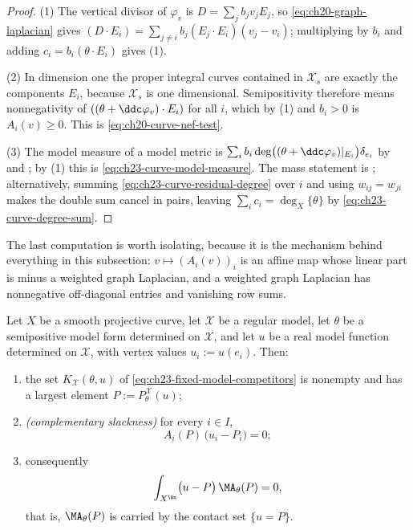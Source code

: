 \begin{proof}
(1) The vertical divisor of \(\varphi_v\) is \(D=\sum_jb_jv_jE_j\), so
\eqref{eq:ch20-graph-laplacian} gives
\((D\cdot E_i)=\sum_{j\ne i}b_j(E_j\cdot E_i)(v_j-v_i)\); multiplying by
\(b_i\) and adding \(c_i=b_i(\theta\cdot E_i)\) gives (1).

(2) In dimension one the proper integral curves contained in
\(\mathcal X_s\) are exactly the components \(E_i\), because
\(\mathcal X_s\) is one dimensional.  Semipositivity therefore means
nonnegativity of \(((\theta+\ddc\varphi_v)\cdot E_i)\) for all \(i\), which
by (1) and \(b_i>0\) is \(A_i(v)\geq0\).  This is
\eqref{eq:ch20-curve-nef-test}.

(3) The model measure of a model metric is
\(\sum_ib_i\deg\bigl((\theta+\ddc\varphi_v)|_{E_i}\bigr)\delta_{e_i}\) by
 and ; by (1) this is
\eqref{eq:ch23-curve-model-measure}.  The mass statement is
; alternatively, summing
\eqref{eq:ch23-curve-residual-degree} over \(i\) and using
\(w_{ij}=w_{ji}\) makes the double sum cancel in pairs, leaving
\(\sum_ic_i=\deg_X\{\theta\}\) by \eqref{eq:ch23-curve-degree-sum}.
\end{proof}

The last computation is worth isolating, because it is the mechanism behind
everything in this subsection: \(v\mapsto(A_i(v))_i\) is an affine map whose
linear part is minus a weighted graph Laplacian, and a weighted graph
Laplacian has nonnegative off-diagonal entries and vanishing row sums.

\begin{theorem}
\label{thm:ch23-model-orthogonality-curve}
Let \(X\) be a smooth projective curve, let \(\mathcal X\) be a regular
model, let \(\theta\) be a semipositive model form determined on
\(\mathcal X\), and let \(u\) be a real model function determined on
\(\mathcal X\), with vertex values \(u_i:=u(e_i)\).  Then:
\begin{enumerate}
\item the set \(K_{\mathcal X}(\theta,u)\) of
\eqref{eq:ch23-fixed-model-competitors} is nonempty and has a largest
element \(P:=P^{\mathcal X}_\theta(u)\);
\item \emph{(complementary slackness)} for every \(i\in I\),
\begin{equation}\label{eq:ch23-complementary-slackness}
 A_i(P)\,\bigl(u_i-P_i\bigr)=0 ;
\end{equation}
\item consequently
\begin{equation}\label{eq:ch23-model-orthogonality}
 \int_{X^{\An}}\bigl(u-P\bigr)\,\MA_\theta(P)=0,
\end{equation}
that is, \(\MA_\theta(P)\) is carried by the contact set
\(\{u=P\}\).
\end{enumerate}
\end{theorem}

